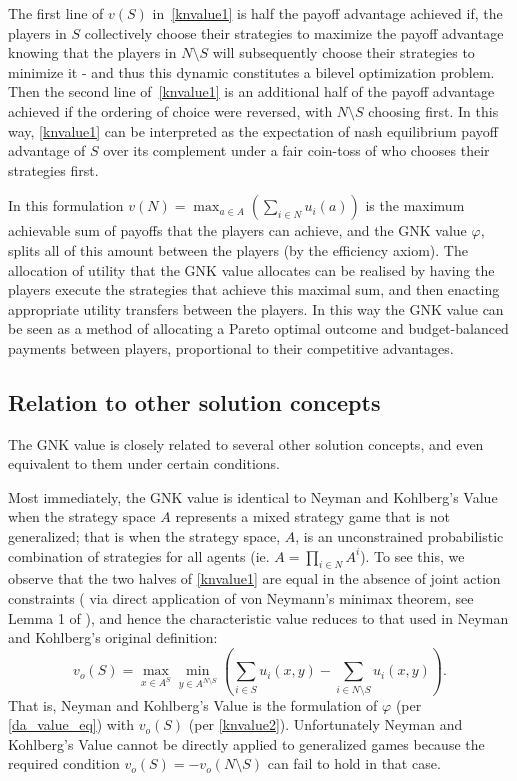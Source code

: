 The first line of $v(S)$ in~\eqref{knvalue1} is half the payoff advantage achieved if, the players in $S$ collectively choose their strategies to maximize the payoff advantage knowing that the players in $N\setminus S$ will subsequently choose their strategies to minimize it - and thus this dynamic constitutes a bilevel optimization problem.
Then the second line of~\eqref{knvalue1} is an additional half of the payoff advantage achieved if the ordering of choice were reversed, with $N\setminus S$ choosing first.
In this way, \eqref{knvalue1} can be interpreted as the expectation of nash equilibrium payoff advantage of $S$ over its complement under a fair coin-toss of who chooses their strategies first.

In this formulation $v(N) = \max_{a\in A} (\sum_{i\in N} u_i(a))$ is the maximum achievable sum of payoffs that the players can achieve, and the GNK value $\varphi$, splits all of this amount between the players (by the efficiency axiom).
The allocation of utility that the GNK value allocates can be realised by having the players execute the strategies that achieve this maximal sum, and then enacting appropriate utility transfers between the players.
In this way the GNK value can be seen as a method of allocating a Pareto optimal outcome and budget-balanced payments between players, proportional to their competitive advantages.

\subsection{Relation to other solution concepts}\label{relating_to_the_old}

The GNK value is closely related to several other solution concepts, and even equivalent to them under certain conditions.

Most immediately, the GNK value is identical to Neyman and Kohlberg's Value \cite{value2} when the strategy space $A$ represents a mixed strategy game that is not generalized; 
 that is when the strategy space, $A$, is an unconstrained probabilistic combination of strategies for all agents (ie. $A = \prod_{i\in N}A^i$).
To see this, we observe that the two halves of \eqref{knvalue1} are equal in the absence of joint action constraints (%
via direct application of von Neymann's minimax theorem, see Lemma 1 of \cite{value2}), 
and hence the characteristic value reduces to that used in Neyman and Kohlberg's original definition:
\begin{equation}\label{knvalue2}v_o(S) = \max_{x\in A^S}\min_{y\in A^{N\setminus S}} \left(\sum_{i\in S} u_i(x,y) - \sum_{i\in N\setminus S} u_i(x,y) \right).\end{equation}
%
That is, Neyman and Kohlberg's Value is the formulation of $\varphi$ (per \eqref{da_value_eq}) 
with $v_o(S)$ (per \eqref{knvalue2}).
Unfortunately Neyman and Kohlberg's Value cannot be directly applied to generalized games because the required condition $v_o(S)=-v_o(N\setminus S)$ can fail to hold in that case. 

